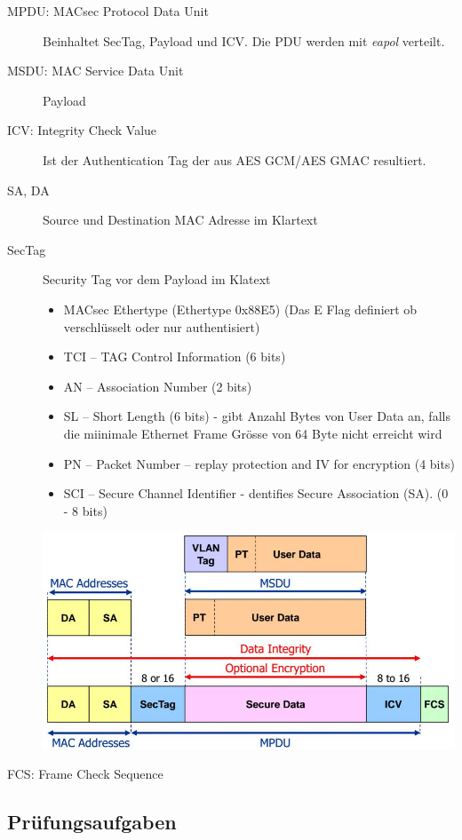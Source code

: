 \begin{description}
	\item[MPDU: MACsec Protocol Data Unit] Beinhaltet SecTag, Payload und ICV. Die PDU werden mit \textit{eapol} verteilt.
	\item[MSDU: MAC Service Data Unit] Payload
	\item[ICV: Integrity Check Value] Ist der Authentication Tag der aus AES GCM/AES GMAC resultiert.
	\item[SA, DA] Source und Destination MAC Adresse im Klartext
	\item[SecTag] Security Tag vor dem Payload  im Klatext
	\begin{itemize}
		\item MACsec Ethertype (Ethertype 0x88E5) (Das E Flag definiert ob verschlüsselt oder nur authentisiert)
		\item TCI – TAG Control Information (6 bits) 
		\item AN – Association Number (2 bits)
		\item SL – Short Length (6 bits) - gibt Anzahl Bytes von User Data an, falls die miinimale Ethernet Frame Grösse von 64 Byte nicht erreicht wird
		\item PN – Packet Number – replay protection and IV for encryption (4 bits)
		\item SCI – Secure Channel Identifier - dentifies Secure Association (SA). (0 - 8 bits)
	\end{itemize}
\begin{minipage}[t]{1\textwidth}
    \centering
	\includegraphics[width=0.6\linewidth]{images/macsec_frame_format}
\end{minipage}
	\item[FCS: Frame Check Sequence] 
\end{description}

\subsection{Prüfungsaufgaben}


